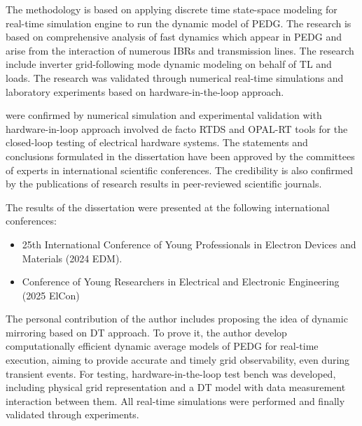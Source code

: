 
{\methods} The methodology is based on applying discrete time state-space modeling for real-time simulation engine to run the dynamic model of PEDG. The research is based on comprehensive analysis of fast dynamics which appear in PEDG and arise from the interaction of numerous IBRs and transmission lines. The research include inverter grid-following mode dynamic modeling on behalf of TL and loads.  The research was validated through numerical real-time simulations and laboratory experiments based on hardware-in-the-loop approach. 



{\reliability} were confirmed by numerical simulation and experimental validation with hardware-in-loop approach involved de facto RTDS and OPAL-RT tools for the closed-loop testing of electrical hardware systems. The statements and conclusions formulated in the dissertation have been approved by the committees of experts in international scientific conferences. The credibility is also confirmed by the publications of research results in peer-reviewed scientific journals. 


{\probation}
The results of the dissertation were presented at the following international conferences:
\begin{itemize}
    \item 25th International Conference of Young Professionals in Electron Devices and Materials (2024 EDM).
    \item Conference of Young Researchers in Electrical and Electronic Engineering (2025 ElCon)
\end{itemize}

{\contribution} The personal contribution of the author includes proposing the idea of dynamic mirroring based on DT approach. To prove it, the author develop computationally efficient dynamic average models of PEDG for real-time execution, aiming to provide accurate and timely grid observability, even during transient events. For testing, hardware-in-the-loop test bench was developed, including physical grid representation and a DT model with data measurement interaction between them. All real-time simulations were performed and finally validated through experiments. 

